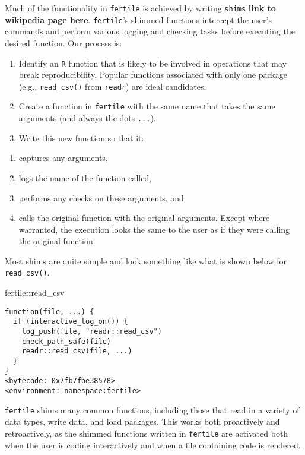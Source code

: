 \documentclass[12pt,twoside]{reedthesis}
\newenvironment{Shaded}{\begin{snugshade}}{\end{snugshade}}
\newcommand{\OperatorTok}[1]{\textcolor[rgb]{0.81,0.36,0.00}{\textbf{#1}}}
\newcommand{\NormalTok}[1]{#1}
\providecommand{\tightlist}{%
  \setlength{\itemsep}{0pt}\setlength{\parskip}{0pt}}
\begin{document}
Much of the functionality in \texttt{fertile} is achieved by writing
\texttt{shims} \textbf{link to wikipedia page here}. \texttt{fertile}'s
shimmed functions intercept the user's commands and perform various
logging and checking tasks before executing the desired function. Our
process is:
\begin{enumerate}
\def\labelenumi{\arabic{enumi}.}
\item
  Identify an \texttt{R} function that is likely to be involved in
  operations that may break reproducibility. Popular functions
  associated with only one package (e.g., \texttt{read\_csv()} from
  \texttt{readr}) are ideal candidates.
\item
  Create a function in \texttt{fertile} with the same name that takes
  the same arguments (and always the dots \texttt{...}).
\item
  Write this new function so that it:
\end{enumerate}
\begin{enumerate}
\def\labelenumi{\alph{enumi})}
\tightlist
\item
  captures any arguments,
\item
  logs the name of the function called,
\item
  performs any checks on these arguments, and
\item
  calls the original function with the original arguments. Except where
  warranted, the execution looks the same to the user as if they were
  calling the original function.
\end{enumerate}
Most shims are quite simple and look something like what is shown below
for \texttt{read\_csv()}.
\begin{Shaded}
\begin{Highlighting}[]
\NormalTok{fertile}\OperatorTok{::}\NormalTok{read_csv}
\end{Highlighting}
\end{Shaded}
\begin{verbatim}
function(file, ...) {
  if (interactive_log_on()) {
    log_push(file, "readr::read_csv")
    check_path_safe(file)
    readr::read_csv(file, ...)
  }
}
<bytecode: 0x7fb7fbe38578>
<environment: namespace:fertile>
\end{verbatim}
\texttt{fertile} shims many common functions, including those that read
in a variety of data types, write data, and load packages. This works
both proactively and retroactively, as the shimmed functions written in
\texttt{fertile} are activated both when the user is coding
interactively and when a file containing code is rendered.
\end{document}
